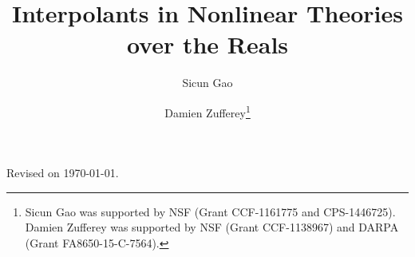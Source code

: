 \documentclass{llncs}
\begin{document}

\title{Interpolants in Nonlinear Theories over the Reals}
\author{Sicun Gao \and Damien Zufferey\thanks{Sicun Gao was supported by NSF (Grant CCF-1161775 and CPS-1446725). 
Damien Zufferey was supported by NSF (Grant CCF-1138967) and DARPA (Grant FA8650-15-C-7564).}}


\maketitle

\begin{center}
Revised on \today.
\end{center}

\begin{abstract}

\end{abstract}










\appendix
%
\end{document}
